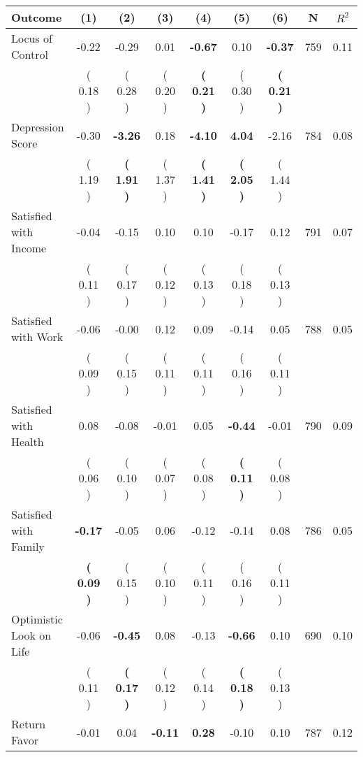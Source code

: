 \begin{tabular}{lcccccccc}
\toprule
 \textbf{Outcome} & \textbf{(1)} & \textbf{(2)} & \textbf{(3)} & \textbf{(4)} & \textbf{(5)} & \textbf{(6)} & \textbf{N} & \textbf{$ R^2$} \\
\midrule
Locus of Control &     -0.22 &     -0.29 &      0.01 & \textbf{    -0.67} &      0.10 & \textbf{    -0.37} & 759 &       0.11 \\ 
 & (     0.18 ) & (     0.28 ) & (     0.20 ) & \textbf{(     0.21 )} & (     0.30 ) & \textbf{(     0.21 )} & \\
Depression Score &     -0.30 & \textbf{    -3.26} &      0.18 & \textbf{    -4.10} & \textbf{     4.04} &     -2.16 & 784 &       0.08 \\ 
 & (     1.19 ) & \textbf{(     1.91 )} & (     1.37 ) & \textbf{(     1.41 )} & \textbf{(     2.05 )} & (     1.44 ) & \\
Satisfied with Income &     -0.04 &     -0.15 &      0.10 &      0.10 &     -0.17 &      0.12 & 791 &       0.07 \\ 
 & (     0.11 ) & (     0.17 ) & (     0.12 ) & (     0.13 ) & (     0.18 ) & (     0.13 ) & \\
Satisfied with Work &     -0.06 &     -0.00 &      0.12 &      0.09 &     -0.14 &      0.05 & 788 &       0.05 \\ 
 & (     0.09 ) & (     0.15 ) & (     0.11 ) & (     0.11 ) & (     0.16 ) & (     0.11 ) & \\
Satisfied with Health &      0.08 &     -0.08 &     -0.01 &      0.05 & \textbf{    -0.44} &     -0.01 & 790 &       0.09 \\ 
 & (     0.06 ) & (     0.10 ) & (     0.07 ) & (     0.08 ) & \textbf{(     0.11 )} & (     0.08 ) & \\
Satisfied with Family & \textbf{    -0.17} &     -0.05 &      0.06 &     -0.12 &     -0.14 &      0.08 & 786 &       0.05 \\ 
 & \textbf{(     0.09 )} & (     0.15 ) & (     0.10 ) & (     0.11 ) & (     0.16 ) & (     0.11 ) & \\
Optimistic Look on Life &     -0.06 & \textbf{    -0.45} &      0.08 &     -0.13 & \textbf{    -0.66} &      0.10 & 690 &       0.10 \\ 
 & (     0.11 ) & \textbf{(     0.17 )} & (     0.12 ) & (     0.14 ) & \textbf{(     0.18 )} & (     0.13 ) & \\
Return Favor &     -0.01 &      0.04 & \textbf{    -0.11} & \textbf{     0.28} &     -0.10 &      0.10 & 787 &       0.12 \\ 

\end{tabular}
